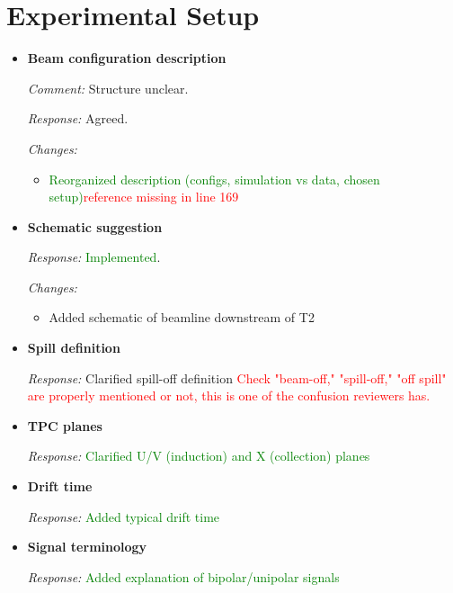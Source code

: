 \documentclass[11pt]{article}
\begin{document}
\section*{Experimental Setup}

\begin{itemize}[leftmargin=*]

\item \textbf{Beam configuration description}

\textit{Comment:} Structure unclear.

\textit{Response:} Agreed.

\textit{Changes:}
\begin{itemize}
\item \textcolor{green}{Reorganized description (configs, simulation vs data, chosen setup)}\textcolor{red}{reference missing in line 169}
\end{itemize}


\item \textbf{Schematic suggestion}

\textit{Response:} \textcolor{green}{Implemented}.

\textit{Changes:}
\begin{itemize}
\item Added schematic of beamline downstream of T2
\end{itemize}


\item \textbf{Spill definition}

\textit{Response:} Clarified spill-off definition
\textcolor{red}{Check "beam-off," "spill-off," "off spill" are properly mentioned or not, this is one of the confusion reviewers has.}

\item \textbf{TPC planes}

\textit{Response:} \textcolor{green}{Clarified U/V (induction) and X (collection) planes}


\item \textbf{Drift time}

\textit{Response:} \textcolor{green}{Added typical drift time}


\item \textbf{Signal terminology}

\textit{Response:} \textcolor{green}{Added explanation of bipolar/unipolar signals}

\end{itemize}
\end{document}
